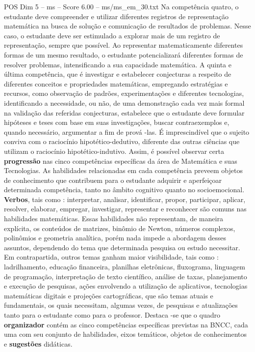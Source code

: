 \begin{textsample}{POS Dim 5 – ms – Score 6.00 – ms/ms\_em\_30.txt}
Na competência quatro, o estudante deve compreender e utilizar diferentes registros de representação matemática na busca de solução e comunicação de resultados de problemas.
Nesse caso, o estudante deve ser estimulado a explorar mais de um registro de representação, sempre que possível.
Ao representar matematicamente diferentes formas de um mesmo resultado, o estudante potencializará diferentes formas de resolver problemas, intensificando a sua capacidade matemática.
A quinta e última competência, que é investigar e estabelecer conjecturas a respeito de diferentes conceitos e propriedades matemáticas, empregando estratégias e recursos, como observação de padrões, experimentações e diferentes tecnologias, identificando a necessidade, ou não, de uma demonstração cada vez mais formal na validação das referidas conjecturas, estabelece que o estudante deve formular hipóteses e teses com base em suas investigações, buscar contraexemplos e, quando necessário, argumentar a fim de prová -las.
É imprescindível que o sujeito conviva com o raciocínio hipotético-dedutivo, diferente das outras ciências que utilizam o raciocínio hipotético-indutivo.
Assim, é possível observar certa \textbf{progressão} nas cinco competências específicas da área de Matemática e suas Tecnologias.
As habilidades relacionadas em cada competência preveem objetos de conhecimento que contribuem para o estudante adquirir e aperfeiçoar determinada competência, tanto no âmbito cognitivo quanto no socioemocional. \textbf{Verbos}, tais como : interpretar, analisar, identificar, propor, participar, aplicar, resolver, elaborar, empregar, investigar, representar e reconhecer são comuns nas habilidades matemáticas.
Essas habilidades não representam, de maneira explícita, os conteúdos de matrizes, binômio de Newton, números complexos, polinômios e geometria analítica, porém nada impede a abordagem desses assuntos, dependendo do tema que determinada pesquisa ou estudo necessitar.
Em contrapartida, outros temas ganham maior visibilidade, tais como : ladrilhamento, educação financeira, planilhas eletrônicas, fluxograma, linguagem de programação, interpretação de texto científico, análise de taxas, planejamento e execução de pesquisas, ações envolvendo a utilização de aplicativos, tecnologias matemáticas digitais e projeções cartográficas, que são temas atuais e fundamentais, os quais necessitam, algumas vezes, de pesquisas e atualizações tanto para o estudante como para o professor.
Destaca -se que o quadro \textbf{organizador} contém as cinco competências específicas previstas na BNCC, cada uma com seu conjunto de habilidades, eixos temáticos, objetos de conhecimentos e \textbf{sugestões} didáticas.

\end{textsample}
